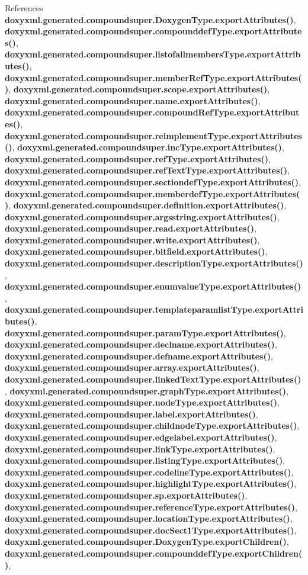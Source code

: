 References {\bf doxyxml.\+generated.\+compoundsuper.\+Doxygen\+Type.\+export\+Attributes()}, {\bf doxyxml.\+generated.\+compoundsuper.\+compounddef\+Type.\+export\+Attributes()}, {\bf doxyxml.\+generated.\+compoundsuper.\+listofallmembers\+Type.\+export\+Attributes()}, {\bf doxyxml.\+generated.\+compoundsuper.\+member\+Ref\+Type.\+export\+Attributes()}, {\bf doxyxml.\+generated.\+compoundsuper.\+scope.\+export\+Attributes()}, {\bf doxyxml.\+generated.\+compoundsuper.\+name.\+export\+Attributes()}, {\bf doxyxml.\+generated.\+compoundsuper.\+compound\+Ref\+Type.\+export\+Attributes()}, {\bf doxyxml.\+generated.\+compoundsuper.\+reimplement\+Type.\+export\+Attributes()}, {\bf doxyxml.\+generated.\+compoundsuper.\+inc\+Type.\+export\+Attributes()}, {\bf doxyxml.\+generated.\+compoundsuper.\+ref\+Type.\+export\+Attributes()}, {\bf doxyxml.\+generated.\+compoundsuper.\+ref\+Text\+Type.\+export\+Attributes()}, {\bf doxyxml.\+generated.\+compoundsuper.\+sectiondef\+Type.\+export\+Attributes()}, {\bf doxyxml.\+generated.\+compoundsuper.\+memberdef\+Type.\+export\+Attributes()}, {\bf doxyxml.\+generated.\+compoundsuper.\+definition.\+export\+Attributes()}, {\bf doxyxml.\+generated.\+compoundsuper.\+argsstring.\+export\+Attributes()}, {\bf doxyxml.\+generated.\+compoundsuper.\+read.\+export\+Attributes()}, {\bf doxyxml.\+generated.\+compoundsuper.\+write.\+export\+Attributes()}, {\bf doxyxml.\+generated.\+compoundsuper.\+bitfield.\+export\+Attributes()}, {\bf doxyxml.\+generated.\+compoundsuper.\+description\+Type.\+export\+Attributes()}, {\bf doxyxml.\+generated.\+compoundsuper.\+enumvalue\+Type.\+export\+Attributes()}, {\bf doxyxml.\+generated.\+compoundsuper.\+templateparamlist\+Type.\+export\+Attributes()}, {\bf doxyxml.\+generated.\+compoundsuper.\+param\+Type.\+export\+Attributes()}, {\bf doxyxml.\+generated.\+compoundsuper.\+declname.\+export\+Attributes()}, {\bf doxyxml.\+generated.\+compoundsuper.\+defname.\+export\+Attributes()}, {\bf doxyxml.\+generated.\+compoundsuper.\+array.\+export\+Attributes()}, {\bf doxyxml.\+generated.\+compoundsuper.\+linked\+Text\+Type.\+export\+Attributes()}, {\bf doxyxml.\+generated.\+compoundsuper.\+graph\+Type.\+export\+Attributes()}, {\bf doxyxml.\+generated.\+compoundsuper.\+node\+Type.\+export\+Attributes()}, {\bf doxyxml.\+generated.\+compoundsuper.\+label.\+export\+Attributes()}, {\bf doxyxml.\+generated.\+compoundsuper.\+childnode\+Type.\+export\+Attributes()}, {\bf doxyxml.\+generated.\+compoundsuper.\+edgelabel.\+export\+Attributes()}, {\bf doxyxml.\+generated.\+compoundsuper.\+link\+Type.\+export\+Attributes()}, {\bf doxyxml.\+generated.\+compoundsuper.\+listing\+Type.\+export\+Attributes()}, {\bf doxyxml.\+generated.\+compoundsuper.\+codeline\+Type.\+export\+Attributes()}, {\bf doxyxml.\+generated.\+compoundsuper.\+highlight\+Type.\+export\+Attributes()}, {\bf doxyxml.\+generated.\+compoundsuper.\+sp.\+export\+Attributes()}, {\bf doxyxml.\+generated.\+compoundsuper.\+reference\+Type.\+export\+Attributes()}, {\bf doxyxml.\+generated.\+compoundsuper.\+location\+Type.\+export\+Attributes()}, {\bf doxyxml.\+generated.\+compoundsuper.\+doc\+Sect1\+Type.\+export\+Attributes()}, {\bf doxyxml.\+generated.\+compoundsuper.\+Doxygen\+Type.\+export\+Children()}, {\bf doxyxml.\+generated.\+compoundsuper.\+compounddef\+Type.\+export\+Children()}, 